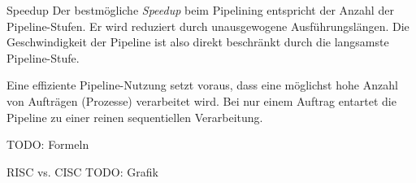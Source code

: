 \begin{defi}[Pipelining]{Speedup}
    Der bestmögliche \emph{Speedup} beim Pipelining entspricht der Anzahl der Pipeline-Stufen.
    Er wird reduziert durch unausgewogene Ausführungslängen.
    Die Geschwindigkeit der Pipeline ist also direkt beschränkt durch die langsamste Pipeline-Stufe.

    Eine effiziente Pipeline-Nutzung setzt voraus, dass eine möglichst hohe Anzahl von Aufträgen (Prozesse) verarbeitet wird.
    Bei nur einem Auftrag entartet die Pipeline zu einer reinen sequentiellen Verarbeitung.

    TODO: Formeln
\end{defi}

\begin{example}[Pipelining]{RISC vs. CISC}
    TODO: Grafik
\end{example}